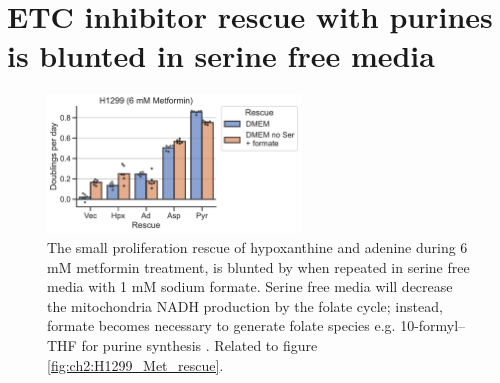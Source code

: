 \section{ETC inhibitor rescue with purines is blunted in serine free media}
\begin{figure}[ht]
    \centering
    \includegraphics[width=0.6\textwidth]{figures/chap2/app/H1299_Met_rescue_noSer.pdf}
    \caption[ETC inhibitor purine rescue in serine free media.]{
    The small proliferation rescue of hypoxanthine and adenine during 6 mM metformin treatment, is blunted by when repeated in serine free media with 1 mM sodium formate.
    Serine free media will decrease the mitochondria NADH production by the folate cycle; instead, formate becomes necessary to generate folate species e.g. 10-formyl–THF for purine synthesis \cite{Ducker2016-mz, Ducker2017-mb, Yang2020-fs}.
    Related to figure \ref{fig:ch2:H1299_Met_rescue}.
    }
    \label{fig:app_ch2:H1299_Met_rescue_noSer}
\end{figure}




